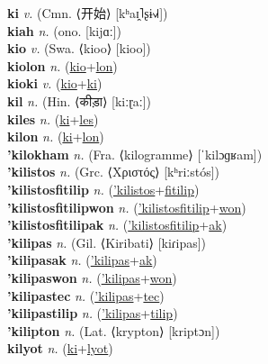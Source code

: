 \textbf{ki} \textit{v.} (Cmn. ⟨开始⟩ [kʰaɪ̯˥ʂɨ˧˩˧])
 \label{ki} \\
\textbf{kiah} \textit{n.} (ono. [kijɑː])
 \label{kiah} \\
\textbf{kio} \textit{v.} (Swa. ⟨kioo⟩ [kioo])
 \label{kio} \\
\textbf{kiolon} \textit{n.} (\hyperref[kio]{kio}+\hyperref[lon]{lon})
 \label{kiolon} \\
\textbf{kioki} \textit{v.} (\hyperref[kio]{kio}+\hyperref[ki]{ki})
 \label{kioki} \\
\textbf{kil} \textit{n.} (Hin. ⟨कीड़ा⟩ [kiːɽaː])
 \label{kil} \\
\textbf{kiles} \textit{n.} (\hyperref[ki]{ki}+\hyperref[les]{les})
 \label{kiles} \\
\textbf{kilon} \textit{n.} (\hyperref[ki]{ki}+\hyperref[lon]{lon})
 \label{kilon} \\
\textbf{'kilokham} \textit{n.} (Fra. ⟨kilogramme⟩ [ˈkilɔɡʁam])
 \label{'kilokham} \\
\textbf{'kilistos} \textit{n.} (Grc. ⟨Χριστός⟩ [kʰriːstós])
 \label{'kilistos} \\
\textbf{'kilistosfitilip} \textit{n.} (\hyperref['kilistos]{'kilistos}+\hyperref[fitilip]{fitilip})
 \label{'kilistosfitilip} \\
\textbf{'kilistosfitilipwon} \textit{n.} (\hyperref['kilistosfitilip]{'kilistosfitilip}+\hyperref[won]{won})
 \label{'kilistosfitilipwon} \\
\textbf{'kilistosfitilipak} \textit{n.} (\hyperref['kilistosfitilip]{'kilistosfitilip}+\hyperref[ak]{ak})
 \label{'kilistosfitilipak} \\
\textbf{'kilipas} \textit{n.} (Gil. ⟨Kiribati⟩ [kiɾipas])
 \label{'kilipas} \\
\textbf{'kilipasak} \textit{n.} (\hyperref['kilipas]{'kilipas}+\hyperref[ak]{ak})
 \label{'kilipasak} \\
\textbf{'kilipaswon} \textit{n.} (\hyperref['kilipas]{'kilipas}+\hyperref[won]{won})
 \label{'kilipaswon} \\
\textbf{'kilipastec} \textit{n.} (\hyperref['kilipas]{'kilipas}+\hyperref[tec]{tec})
 \label{'kilipastec} \\
\textbf{'kilipastilip} \textit{n.} (\hyperref['kilipas]{'kilipas}+\hyperref[tilip]{tilip})
 \label{'kilipastilip} \\
\textbf{'kilipton} \textit{n.} (Lat. ⟨krypton⟩ [kriptɔn])
 \label{'kilipton} \\
\textbf{kilyot} \textit{n.} (\hyperref[ki]{ki}+\hyperref[lyot]{lyot})
 \label{kilyot} \\
